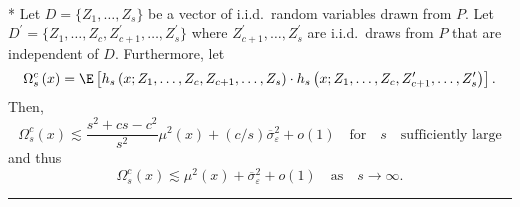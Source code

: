 \newpage
\begin{lem}\label{lem:omega_sc}\mbox{}\\*
	Let $D = \{Z_1, \dotsc, Z_{s}\}$ be a vector of i.i.d.\ random variables drawn from $P$.
	Let $D^{\prime} = \{Z_1, \dotsc, Z_{c}, Z_{c+1}^{\prime}, \dotsc,  Z_{s}^{\prime}\}$ where $Z_{c+1}^{\prime}, \dotsc,  Z_{s}^{\prime}$ are i.i.d.\ draws from $P$ that are independent of $D$.
	Furthermore, let
	\begin{equation}
		\Omega_{s}^{c}\left(x\right)
		= \E\left[h_{s}\left(x; Z_1, \ldots, Z_{c}, Z_{c+1}, \ldots, Z_{s}\right) \cdot
			h_{s}\left(x; Z_1, \ldots,Z_{c}, Z_{c+1}^{\prime}, \ldots, Z_{s}^{\prime}\right)\right].
	\end{equation}
	Then,
	\begin{equation}
		\Omega_{s}^{c}\left(x\right)
		\lesssim \frac{s^2 + cs  - c^2}{s^2} \mu^2(x) + (c/s) \overline{\sigma}_{\varepsilon}^2 + o(1)
		\quad \text{for} \quad s \quad \text{sufficiently large}
	\end{equation}
	and thus
	\begin{equation}
		\Omega_{s}^{c}\left(x\right)
		\lesssim \mu^2(x) + \overline{\sigma}_{\varepsilon}^2 + o(1)
		\quad \text{as} \quad s \rightarrow \infty.
	\end{equation}
\end{lem}
\hrule
